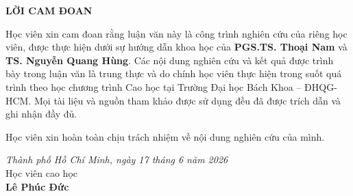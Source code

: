 \newpage

\setcounter{tocdepth}{0}

\begin{center}
    \Large \textbf{LỜI CAM ĐOAN}
\end{center}

Học viên xin cam đoan rằng luận văn này là công trình nghiên cứu của riêng học viên, được thực hiện dưới sự hướng dẫn khoa học của \textbf{PGS.TS. Thoại Nam} và \textbf{TS. Nguyễn Quang Hùng}. Các nội dung nghiên cứu và kết quả được trình bày trong luận văn là trung thực và do chính học viên thực hiện trong suốt quá trình theo học chương trình Cao học tại Trường Đại học Bách Khoa -- ĐHQG-HCM. Mọi tài liệu và nguồn tham khảo được sử dụng đều đã được trích dẫn và ghi nhận đầy đủ.

Học viên xin hoàn toàn chịu trách nhiệm về nội dung nghiên cứu của mình.

\vspace{5mm}

\noindent
\begin{minipage}[t]{0.35\textwidth}
\end{minipage}
\hfill
\begin{minipage}[t]{0.6\textwidth}
\centering
\fontsize{13pt}{15pt}\selectfont
\textit{Thành phố Hồ Chí Minh, ngày 17 tháng 6 năm 2026}\\
Học viên cao học \\
\vspace{3cm} %
\textbf{Lê Phúc Đức}

\end{minipage}
